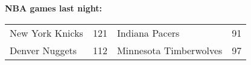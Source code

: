 \textbf{NBA games last night:}
\begin{tabular}{llll}
\toprule
New York Knicks & 121 &         Indiana Pacers & 91 \\
 Denver Nuggets & 112 & Minnesota Timberwolves & 97 \\
\bottomrule
\end{tabular}
